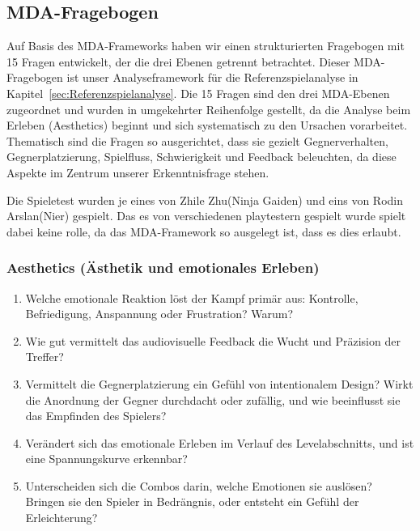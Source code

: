 \documentclass[../Main.tex]{subfiles}
\begin{document}
\subsection{MDA-Fragebogen} \label{sec:Analysefragebogen}

Auf Basis des MDA-Frameworks haben wir einen strukturierten Fragebogen mit 15 Fragen entwickelt, der die drei Ebenen getrennt betrachtet. Dieser MDA-Fragebogen ist unser Analyseframework für die Referenzspielanalyse in Kapitel~\ref{sec:Referenzspielanalyse}. Die 15 Fragen sind den drei MDA-Ebenen zugeordnet und wurden in umgekehrter Reihenfolge gestellt, da die Analyse beim Erleben (Aesthetics) beginnt und sich systematisch zu den Ursachen vorarbeitet. Thematisch sind die Fragen so ausgerichtet, dass sie gezielt Gegnerverhalten, Gegnerplatzierung, Spielfluss, Schwierigkeit und Feedback beleuchten, da diese Aspekte im Zentrum unserer Erkenntnisfrage stehen.

Die Spieletest wurden je eines von Zhile Zhu(Ninja Gaiden) und eins von Rodin Arslan(Nier) gespielt. Das es von verschiedenen playtestern gespielt wurde spielt dabei keine rolle, da das MDA-Framework so ausgelegt ist, dass es dies erlaubt.

\subsubsection{Aesthetics (Ästhetik und emotionales Erleben)}

\begin{enumerate}[label=\textbf{A\arabic*}, leftmargin=1.5cm, itemsep=0.5em]
    \item Welche emotionale Reaktion löst der Kampf primär aus: Kontrolle, Befriedigung, Anspannung oder Frustration? Warum?
    \item Wie gut vermittelt das audiovisuelle Feedback die Wucht und Präzision der Treffer?
    \item Vermittelt die Gegnerplatzierung ein Gefühl von intentionalem Design? Wirkt die Anordnung der Gegner durchdacht oder zufällig, und wie beeinflusst sie das Empfinden des Spielers?
    \item Verändert sich das emotionale Erleben im Verlauf des Levelabschnitts, und ist eine Spannungskurve erkennbar?
    \item Unterscheiden sich die Combos darin, welche Emotionen sie auslösen? Bringen sie den Spieler in Bedrängnis, oder entsteht ein Gefühl der Erleichterung?
\end{enumerate}
\end{document}
